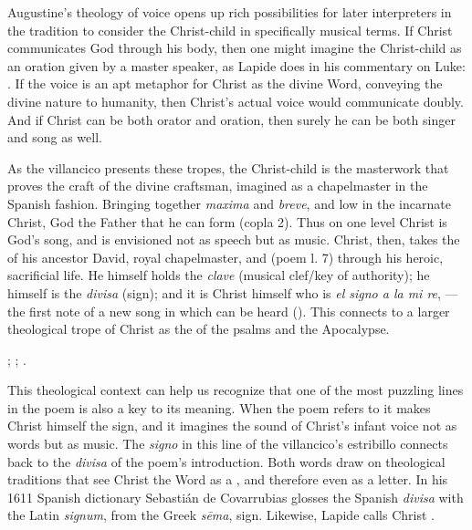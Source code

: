 Augustine's theology of voice opens up rich possibilities for later interpreters
in the tradition to consider the Christ-child in specifically musical terms.
If Christ communicates God through his body, then one might imagine the
Christ-child as an oration given by a master speaker, as Lapide does in his
commentary on Luke:
.%
    \Autocite[673, on ]{Lapide:Gospels19C} 
If the voice is an apt metaphor for Christ as the divine Word, conveying the
divine nature to humanity, then Christ's actual voice would communicate doubly.
And if Christ can be both orator and oration, then surely he can be both singer
and song as well.

As the villancico  presents these tropes, the
Christ-child is the masterwork that proves the craft of the divine craftsman,
imagined as a chapelmaster in the Spanish fashion.
Bringing together \emph{maxima} and \emph{breve},  and low in the
incarnate Christ, God the Father  that he can form
 (copla 2).
Thus on one level Christ is God's song, and  is envisioned not
as speech but as music.
Christ, then, takes the  of his ancestor David, royal
chapelmaster, and  (poem l. 7) through his heroic,
sacrificial life.
He himself holds the \emph{clave} (musical clef/key of authority); he himself is
the \emph{divisa} (sign); and it is Christ himself who is \emph{el signo a la mi
re}, ---the first note of a new song in which can be heard
 ().
This connects to a larger theological trope of Christ as the 
of the psalms and the Apocalypse.%
\begin{Footnote}
    ; ;
    .
\end{Footnote}

This theological context can help us recognize that one of the most puzzling
lines in the poem is also a key to its meaning. 
When the poem refers to  it makes
Christ himself the sign, and it imagines the sound of Christ's infant voice not
as words but as music. 
The \emph{signo} in this line of the villancico's estribillo connects back to
the \emph{divisa} of the poem's introduction.
Both words draw on theological traditions that see Christ the Word as a
, and therefore even as a letter.
In his 1611 Spanish dictionary Sebastián de Covarrubias glosses the Spanish
\emph{divisa} with the Latin \emph{signum}, from the Greek \emph{sēma}, sign. 
Likewise, Lapide calls Christ .%
    \Autocites
    []{Covarrubias:Tesoro}
    [685--686, on Lk 2]{Lapide:Gospels19C} %


